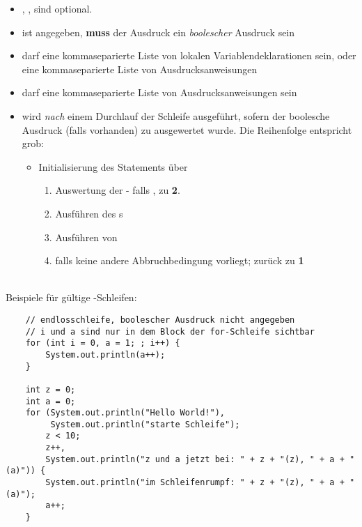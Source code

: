 \begin{itemize}
    \item {}, ,  sind optional.
    \item ist  angegeben, \textbf{muss} der Ausdruck ein \textit{boolescher} Ausdruck sein
    \item {} darf eine kommaseparierte Liste von lokalen Variablendeklarationen sein, oder eine kommaseparierte Liste von Ausdrucksanweisungen
    \item {} darf eine kommaseparierte Liste von Ausdrucksanweisungen sein
    \item {} wird \textit{nach} einem Durchlauf der Schleife ausgeführt, sofern der boolesche Ausdruck (falls vorhanden) zu  ausgewertet wurde.
    Die Reihenfolge entspricht grob:
    \begin{itemize}
        \item Initialisierung des Statements über 
        \begin{enumerate}
            \item Auswertung der  - falls , zu \textbf{2}.
            \item Ausführen des s
            \item Ausführen von 
            \item falls keine andere Abbruchbedingung vorliegt; zurück zu \textbf{1}
        \end{enumerate}

    \end{itemize}

\end{itemize}\\

\noindent
Beispiele für gültige -Schleifen:

\begin{verbatim}
    // endlosschleife, boolescher Ausdruck nicht angegeben
    // i und a sind nur in dem Block der for-Schleife sichtbar
    for (int i = 0, a = 1; ; i++) {
        System.out.println(a++);
    }

    int z = 0;
    int a = 0;
    for (System.out.println("Hello World!"),
         System.out.println("starte Schleife");
        z < 10;
        z++,
        System.out.println("z und a jetzt bei: " + z + "(z), " + a + "(a)")) {
        System.out.println("im Schleifenrumpf: " + z + "(z), " + a + "(a)");
        a++;
    }


\end{verbatim}

